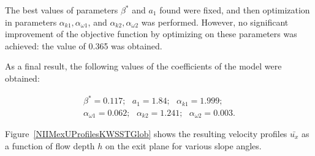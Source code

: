 \documentclass[mathematics,article,accept,pdftex,moreauthors]{Definitions/mdpi}
\begin{document}
The best values of parameters $\beta^*$ and $a_1$ found were fixed, and then optimization in parameters $\alpha_{k1}, \alpha_{\omega1}$, and $\alpha_{k2}, \alpha_{\omega2}$ was performed. 
However, no significant improvement of the objective function by optimizing on these parameters was achieved: the value of 0.365 was obtained.


%
%

As a final result, the following values of the coefficients of the model were obtained:

\begin{linenomath}
\begin{equation}
	\begin{aligned}
		\beta^* = 0.117;\ \ \ a_1 = 1.84;\ \ \ \alpha_{k 1} = 1.999;\\
		\alpha_{\omega 1} = 0.062; \ \ \ \alpha_{k 2} = 1.241;\ \ \ \alpha_{\omega 2} = 0.003.
	\end{aligned}
\end{equation}
\end{linenomath}

Figure~\ref{NIIMexUProfilesKWSSTGlob} shows the resulting velocity profiles $\bar{ {u_x}}$ as a function of flow depth $h$ on the exit plane for various slope angles.
\end{document}
